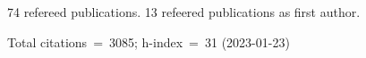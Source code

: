 74 refereed publications. 13 refeered publications as first author.

Total citations~=~3085; h-index~=~31 (2023-01-23)